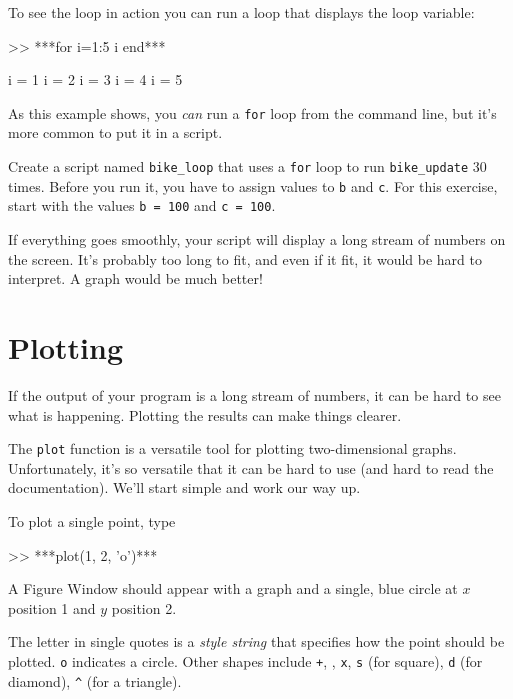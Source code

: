 
To see the loop in action you can run a loop that displays the
loop variable:

\begin{code}
>> ***for i=1:5
    i
end***

i = 1
i = 2
i = 3
i = 4
i = 5
\end{code}

As this example shows, you {\em can} run a \verb|for| loop from the
command line, but it's more common to put it in a script.

\begin{ex}
Create a script named \verb"bike_loop" that uses a {\tt for} loop to run \verb"bike_update" 30 times.  Before you run it, you have to assign values to {\tt b} and {\tt c}.
For this exercise, start with the values {\tt b = 100} and {\tt c = 100}.

If everything goes smoothly, your script will display a long stream
of numbers on the screen.  It's probably too long
to fit, and even if it fit, it would be hard to interpret.
A graph would be much better!
\end{ex}


\section{Plotting}
\label{plotting}


If the output of your program is a long stream of numbers, it can be hard to see what is happening.
Plotting the results can make things clearer.

The {\tt plot} function is a versatile tool for plotting two-dimensional graphs.  Unfortunately, it's so versatile that it can be hard to use (and hard to read the documentation).
We'll start simple and work our way up.

To plot a single point, type

\begin{code}
>> ***plot(1, 2, 'o')***
\end{code}

A Figure Window should appear with a graph and a single, blue circle at $x$ position 1 and $y$ position 2.  


The letter in single quotes is a \emph{style string} that specifies how the
point should be plotted.  {\tt o} indicates a circle.
Other shapes include {\tt +},
{\tt *},
{\tt x},
{\tt s} (for square),
{\tt d} (for diamond), 
\verb+^+ (for a triangle).

